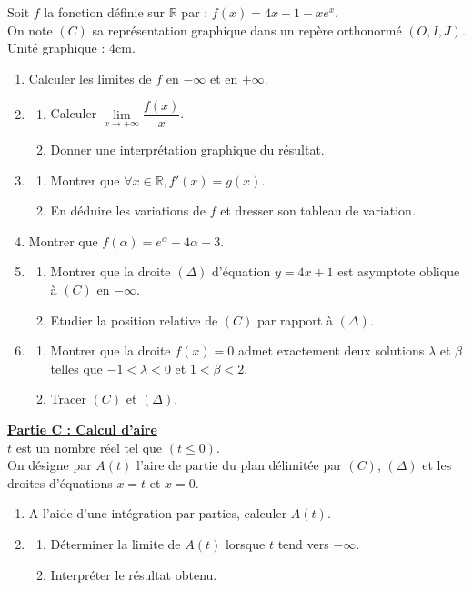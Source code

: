 \documentclass[12pt,a4paper]{article}
\begin{document}
\noindent Soit $f$ la fonction définie sur $\mathbb{R}$ par : $f(x) = 4x + 1 - xe^x$. \\
On note $(C)$ sa représentation graphique dans un repère orthonormé $(O, I, J)$. Unité graphique : 4cm.
\begin{enumerate}
    \item Calculer les limites de $f$ en $-\infty$ et en $+\infty$.
    \item 
    \begin{enumerate}
        \item Calculer $\lim\limits_{x \to +\infty} \dfrac{f(x)}{x}$.
        \item Donner une interprétation graphique du résultat.
    \end{enumerate}
    \item 
    \begin{enumerate}
        \item Montrer que $\forall x \in \mathbb{R}, f'(x) = g(x)$.
        \item En déduire les variations de $f$ et dresser son tableau de variation.
    \end{enumerate}
    \item Montrer que $f(\alpha) = e^\alpha + 4\alpha - 3$.
    \item 
    \begin{enumerate}
        \item Montrer que la droite $(\Delta)$ d'équation $y = 4x + 1$ est asymptote oblique à $(C)$ en $-\infty$.
        \item Etudier la position relative de $(C)$ par rapport à $(\Delta)$.
    \end{enumerate}
    \item 
    \begin{enumerate}
        \item Montrer que la droite $f(x) = 0$ admet exactement deux solutions $\lambda$ et $\beta$ telles que $-1 < \lambda < 0$ et $1 < \beta < 2$.
        \item Tracer $(C)$ et $(\Delta)$.
    \end{enumerate}
\end{enumerate}

\vspace{0.5cm}

\noindent \underline{\textbf{Partie C : Calcul d'aire}} \\

\noindent $t$ est un nombre réel tel que $(t \le 0)$. \\
On désigne par $A(t)$ l'aire de partie du plan délimitée par $(C)$, $(\Delta)$ et les droites d'équations $x = t$ et $x = 0$.
\begin{enumerate}
    \item A l'aide d'une intégration par parties, calculer $A(t)$.
    \item 
    \begin{enumerate}
        \item Déterminer la limite de $A(t)$ lorsque $t$ tend vers $-\infty$.
        \item Interpréter le résultat obtenu.
    \end{enumerate}
\end{enumerate}
\end{document}
